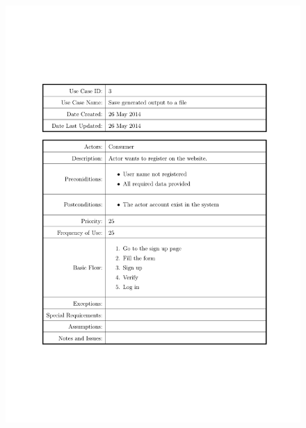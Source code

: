 \documentclass{tufte-book}
\begin{document}
\begin{figure}[h] \includegraphics[width=\linewidth]{Requirements/UseCases/003_SignUp.pdf}\end{figure}
\end{document}
